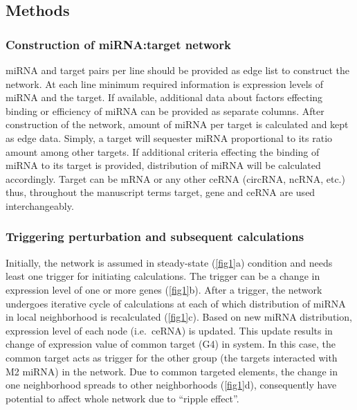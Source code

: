 \documentclass[]{article}
\begin{document}
\hypertarget{methods}{%
\subsection{Methods}\label{methods}}

\hypertarget{construction-of-mirnatarget-network}{%
\subsubsection{Construction of miRNA:target
network}\label{construction-of-mirnatarget-network}}

miRNA and target pairs per line should be provided as edge list to
construct the network. At each line minimum required information is
expression levels of miRNA and the target. If available, additional data
about factors effecting binding or efficiency of miRNA can be provided
as separate columns. After construction of the network, amount of miRNA
per target is calculated and kept as edge data. Simply, a target will
sequester miRNA proportional to its ratio amount among other targets. If
additional criteria effecting the binding of miRNA to its target is
provided, distribution of miRNA will be calculated accordingly. Target
can be mRNA or any other ceRNA (circRNA, ncRNA, etc.) thus, throughout
the manuscript terms target, gene and ceRNA are used interchangeably.

\hypertarget{triggering-perturbation-and-subsequent-calculations}{%
\subsubsection{Triggering perturbation and subsequent
calculations}\label{triggering-perturbation-and-subsequent-calculations}}

Initially, the network is assumed in steady-state (\autoref{fig1}a)
condition and needs least one trigger for initiating calculations. The
trigger can be a change in expression level of one or more genes
(\autoref{fig1}b). After a trigger, the network undergoes iterative
cycle of calculations at each of which distribution of miRNA in local
neighborhood is recalculated (\autoref{fig1}c). Based on new miRNA
distribution, expression level of each node (i.e.~ceRNA) is updated.
This update results in change of expression value of common target (G4)
in system. In this case, the common target acts as trigger for the other
group (the targets interacted with M2 miRNA) in the network. Due to
common targeted elements, the change in one neighborhood spreads to
other neighborhoods (\autoref{fig1}d), consequently have potential to
affect whole network due to ``ripple effect''.
\end{document}
